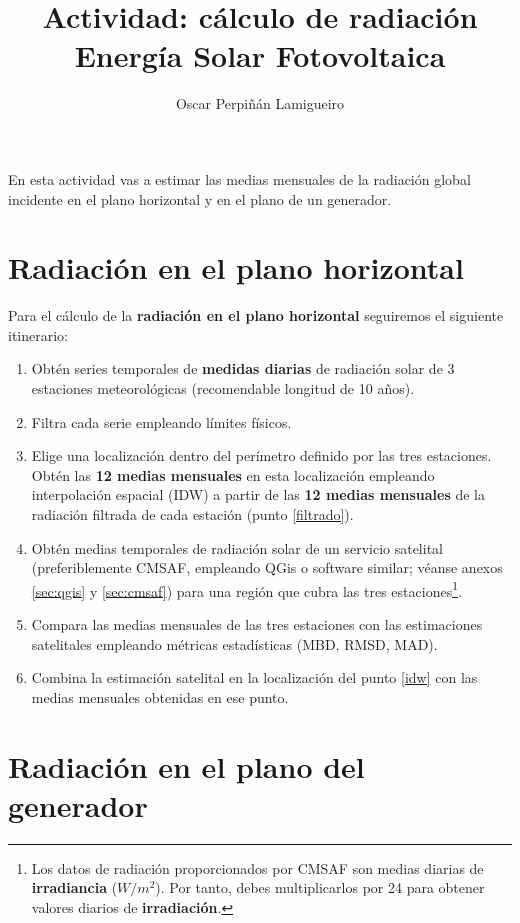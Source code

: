 \documentclass[11pt]{article}
\author{Oscar Perpiñán Lamigueiro}
\date{}
\title{Actividad: cálculo de radiación\\\medskip
\large Energía Solar Fotovoltaica}
\begin{document}
\maketitle

En esta actividad vas a estimar las medias mensuales de la radiación global incidente en el plano horizontal y en el plano de un generador.

\section{Radiación en el plano horizontal}

Para el cálculo de la \textbf{radiación en el plano horizontal} seguiremos el siguiente itinerario:

\begin{enumerate}
\item Obtén series temporales de \textbf{medidas diarias} de radiación solar de 3 estaciones meteorológicas (recomendable longitud de 10 años).
\item Filtra cada serie empleando límites físicos. \label{filtrado}
\item Elige una localización dentro del perímetro definido por las tres estaciones. Obtén las \textbf{12 medias mensuales} en esta localización empleando interpolación espacial (IDW) a partir de las \textbf{12 medias mensuales} de la radiación filtrada de cada estación (punto \ref{filtrado}). \label{idw}
\item Obtén medias temporales de radiación solar de un servicio satelital (preferiblemente CMSAF,  empleando QGis o software similar; véanse anexos \ref{sec:qgis} y \ref{sec:cmsaf}) para una región que cubra las tres estaciones\footnote{Los datos de radiación proporcionados por CMSAF son medias diarias de \textbf{irradiancia} (\(W/m^2\)). Por tanto, debes multiplicarlos por 24 para obtener valores diarios de \textbf{irradiación}.}.\label{satelite}
\item Compara las medias mensuales de las tres estaciones con las estimaciones satelitales empleando métricas estadísticas (MBD, RMSD, MAD).
\item Combina la estimación satelital en la localización del punto \ref{idw} con las medias mensuales obtenidas en ese punto.
\end{enumerate}

\clearpage

\section{Radiación en el plano del generador}
\end{document}
